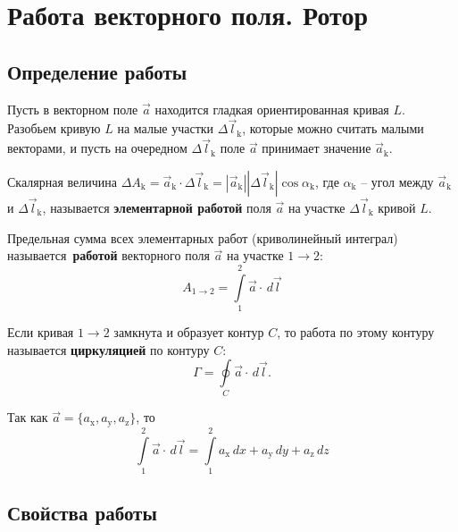 \section{Работа векторного поля. Ротор}

\subsection{Определение работы}

	Пусть в векторном поле \( \vec{a} \) находится гладкая ориентированная кривая \( L \). Разобьем кривую \( L \) на малые участки \( \Delta \vec{l}_\mathrm{k} \), которые можно считать малыми векторами, и пусть на очередном \( \Delta \vec{l}_\mathrm{k} \) поле \( \vec{a} \) принимает значение \( \vec{a}_\mathrm{k} \).
	
	\begin{definition}
	Скалярная величина \( \Delta A_\mathrm{k} = \vec{a}_\mathrm{k}\cdot\Delta\vec{l}_\mathrm{k} = |\vec{a}_\mathrm{k}| |\Delta\vec{l}_\mathrm{k}|\cos\alpha_\mathrm{k} \), где \( \alpha_\mathrm{k} \) -- угол между \( \vec{a}_\mathrm{k} \) и \( \Delta\vec{l}_\mathrm{k} \), называется \textbf{элементарной работой} поля \( \vec{a} \) на участке \( \Delta\vec{l}_\mathrm{k} \) кривой \( L \).
	\end{definition}
	
	\begin{definition}
	Предельная сумма всех элементарных работ (криволинейный интеграл) называется\ \textbf{работой} векторного поля \( \vec{a} \) на участке \( 1\to2 \):
	\[  A_{1\to2} = \int\limits_1^2 \vec{a}\cdot\,d\vec{l} \]
	\end{definition}
	
	Если кривая \( 1 \to 2 \)  замкнута и образует контур \( C \), то работа по этому контуру называется \textbf{циркуляцией} по контуру \( C \):
	\[ \Gamma = \oint\limits_C \vec{a}\cdot\,d\vec{l}. \]
	
	\begin{remark}
	Так как \( \vec{a} = \{ a_\mathrm{x}, a_\mathrm{y}, a_\mathrm{z} \} \), то
	\[ \int\limits_1^2 \vec{a}\cdot\,d\vec{l} = \int\limits_1^2 a_\mathrm{x}\,d x + a_\mathrm{y}\,d y + a_\mathrm{z}\,d z \]
	\end{remark}
	
\subsection{Свойства работы}

